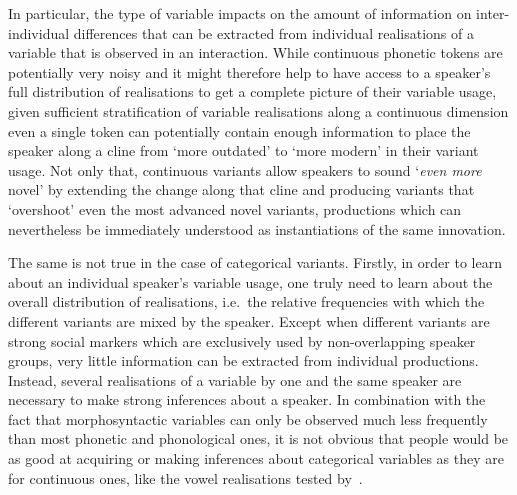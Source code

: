 In particular, the type of variable impacts on the amount of information on inter-individual differences that can be extracted from individual realisations of a variable that is observed in an interaction. While continuous phonetic tokens are potentially very noisy and it might therefore help to have access to a speaker's full distribution of realisations to get a complete picture of their variable usage, given sufficient stratification of variable realisations along a continuous dimension even a single token can potentially contain enough information to place the speaker along a cline from `more outdated' to `more modern' in their variant usage.
Not only that, continuous variants allow speakers to sound `\emph{even more} novel' by extending the change along that cline and producing variants that `overshoot' even the most advanced novel variants, productions which can nevertheless be immediately understood as instantiations of the same innovation.

The same is not true in the case of categorical variants. Firstly, in order to learn about an individual speaker's variable usage,
one truly need to learn about the overall distribution of realisations, i.e.~the relative frequencies with which the different variants are mixed by the speaker.
Except when different variants are strong social markers which are exclusively used by non-overlapping speaker groups, very little information can be extracted from individual productions. %
Instead, several realisations of a variable by one and the same speaker are necessary to make strong inferences about a speaker.
In combination with the fact that morphosyntactic variables can only be observed much less frequently than most phonetic and phonological ones, 
it is not obvious that people would be as good at acquiring or making inferences about categorical variables as they are for continuous ones, like the vowel realisations tested by~\citet{Drager2011}.


